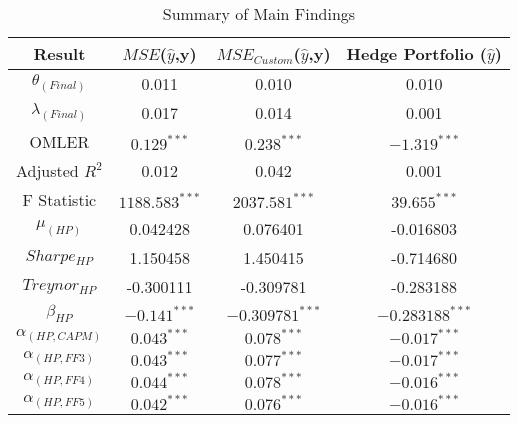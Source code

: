 \begin{table}[H]
    \small
    \centering
    \begin{tabular}{||c||c||c||c||}
        \hline
        Result & $MSE$($\hat{y}$,y) & $MSE_{Custom}$($\hat{y}$,y) & Hedge Portfolio ($\hat{y}$)\\ [0.5ex]
        \hline \hline
        $\theta_{(Final)}$ &0.011 & 0.010 & 0.010\\
        \hline
        $\lambda_{(Final)}$ & 0.017 & 0.014& 0.001 \\
        \hline \hline 
        OMLER & $0.129^{***}$ & $0.238^{***}$ & $-1.319^{***}$\\
        \hline
        Adjusted $R^{2}$ &0.012& 0.042 & 0.001\\
        \hline
        F Statistic & $1188.583^{***}$ & $2037.581^{***}$ & $39.655^{***}$\\
        \hline \hline
        $\mu_{(HP)}$ &0.042428 & 0.076401 & -0.016803\\
        \hline
        $Sharpe_{HP}$& 1.150458& 1.450415&  -0.714680\\ 
        \hline
        $Treynor_{HP}$ & -0.300111 & -0.309781& -0.283188\\ 
        \hline
        $\beta_{HP}$ & $-0.141^{***}$ & $-0.309781^{***}$& $-0.283188^{***}$\\ 
        \hline\hline
        $\alpha_{(HP,CAPM)}$ & $0.043^{***}$ & $0.078^{***}$& $-0.017^{***}$ \\
        \hline
        $\alpha_{(HP,FF3)}$ & $0.043^{***}$ & $0.077^{***}$& $-0.017^{***}$ \\
        \hline
        $\alpha_{(HP,FF4)}$ & $0.044^{***}$& $0.078^{***}$& $-0.016^{***}$\\
        \hline
        $\alpha_{(HP,FF5)}$& $0.042^{***}$ & $0.076^{***}$& $-0.016^{***}$\\
        \hline
    \end{tabular} 
    \caption{Summary of Main Findings}
    \label{main-findings}
\end{table}